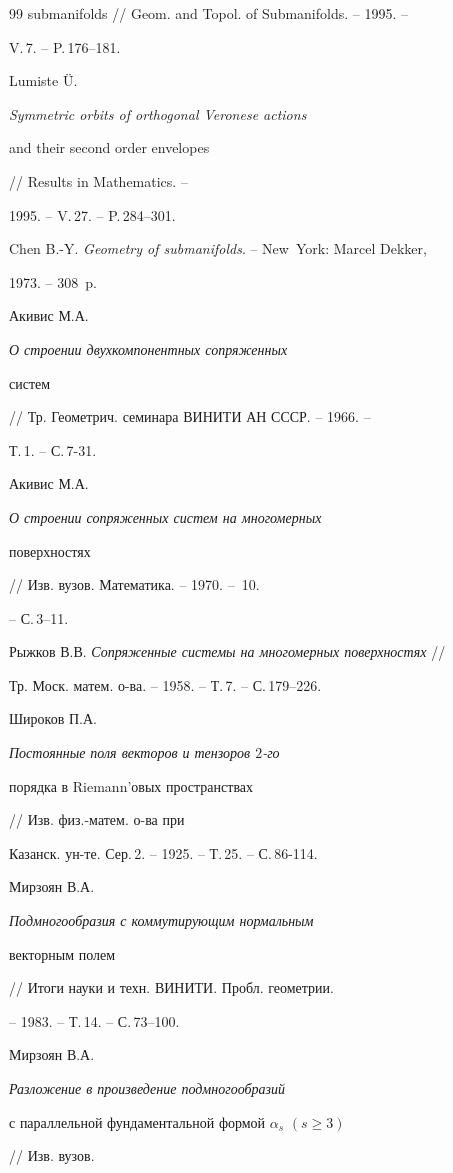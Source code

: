 \begin{thebibliography}{99}
{submanifolds} // Geom. and Topol. of Submanifolds. -- 1995. --


V.\,7. -- P.\,176--181.




Lumiste \"U. {\em Symmetric orbits of orthogonal Veronese actions


and their second order envelopes} // Results in Mathematics. --


1995. -- V.\,27. -- P.\,284--301.




Chen B.-Y. {\em Geometry of submanifolds}. -- New~York: Marcel Dekker,


1973. -- 308~p.




Акивис М.А. {\em О строении двухкомпонентных сопряженных


систем} // Тр. Геометрич. семинара ВИНИТИ АН СССР. -- 1966. --


Т.\,1. -- С.\,7-31.




Акивис М.А. {\em О строении сопряженных систем на многомерных


поверхностях} // Изв. вузов. Математика. -- 1970. -- \No\,10.


-- С.\,3--11.




Рыжков В.В. {\em Сопряженные системы на многомерных поверхностях} //


Тр. Моск. матем. о-ва. -- 1958. -- Т.\,7. -- С.\,179--226.




Широков П.А. {\em Постоянные поля векторов и тензоров $2$-го


порядка в Riemann'овых пространствах} // Изв. физ.-матем. о-ва при


Казанск. ун-те. Сер.\,2. -- 1925. -- Т.\,25. -- С.\,86-114.




Мирзоян В.А. {\em Подмногообразия с коммутирующим нормальным


векторным полем} // Итоги науки и техн. ВИНИТИ. Пробл. геометрии.


-- 1983. -- Т.\,14. -- С.\,73--100.




Мирзоян В.А. {\em Разложение в произведение подмногообразий


с параллельной фундаментальной формой $\alpha_s$ $(s\ge 3)$} // Изв. вузов.



\end{thebibliography}
